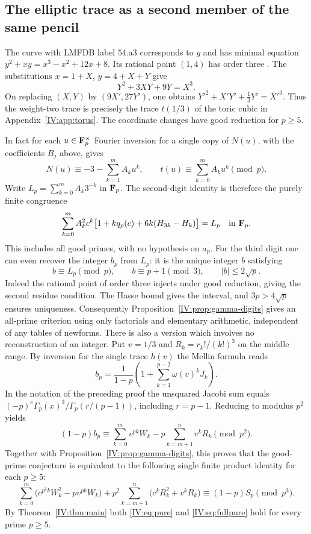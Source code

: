 \documentclass[11pt,letterpaper]{article}
\theoremstyle{definition}
\theoremstyle{remark}
\begin{document}
\subsection{The elliptic trace as a second member of the same pencil}
The curve with LMFDB label $54.\mathrm{a}3$ corresponds to $g$ and has
minimal equation $y^2+xy=x^3-x^2+12x+8$. Its rational point $(1,4)$
has order three \cite{IV:curve}. The substitutions $x=1+X$,
$y=4+X+Y$ give
\[
 Y^2+3XY+9Y=X^3 .
\]
On replacing $(X,Y)$ by $(9X',27Y')$, one obtains
$Y'^2+X'Y'+\tfrac13Y'=X'^3$. Thus the weight-two trace is precisely
the trace $t(1/3)$ of the toric cubic in Appendix~\ref{IV:app:torus}. The
coordinate changes have good reduction for $p\geq5$.

In fact for each $u\in\mathbf F_p^\times$ Fourier inversion for a single
copy of $N(u)$, with the coefficients $B_j$ above, gives
\[
 N(u)\equiv -3-\sum_{k=1}^m A_k u^k,\qquad
 t(u)\equiv \sum_{k=0}^m A_k u^k\pmod p .
\]
Write $L_p=\sum_{k=0}^m A_k3^{-k}$ in $\mathbf F_p$.
The second-digit identity is therefore the purely finite congruence
\begin{equation}\label{IV:eq:pure}
 \sum_{k=0}^m A_k^2c^k\bigl[1+k q_p(c)+6k(H_{3k}-H_k)\bigr]
 = L_p\quad \text{in }\mathbf F_p .
\end{equation}
This includes all good primes, with no hypothesis on $a_p$.
For the third digit one can even recover the integer $b_p$ from $L_p$:
it is the unique integer $b$ satisfying
\[
 b\equiv L_p\pmod p,\qquad b\equiv p+1\pmod3,\qquad |b|\leq2\sqrt p .
\]
Indeed the rational point of order three injects under good
reduction, giving the second residue condition. The Hasse bound
gives the interval, and $3p>4\sqrt p$ ensures uniqueness.
Consequently Proposition~\ref{IV:prop:gamma-digits} gives an all-prime
criterion using only factorials and elementary arithmetic, independent
of any tables of newforms. There is also a version which involves no reconstruction of an integer.
Put $v=1/3$ and $R_k=r_k!/(k!)^3$ on the middle range.
By inversion for the single trace $h(v)$ the Mellin formula reads
\[
 b_p=\frac{1}{1-p}\left(1+\sum_{k=1}^{p-2}\omega(v)^k J_k\right).
\]
In the notation of the preceding proof the unsquared Jacobi sum
equals $(-p)^e\Gamma_p(x)^3/\Gamma_p(r/(p-1))$, including $r=p-1$.
Reducing to modulus $p^2$ yields
\[
 (1-p)b_p\equiv \sum_{k=0}^{m}v^{pk}W_k
                     -p\sum_{k=m+1}^{n}v^kR_k\pmod{p^2}.
\]
Together with Proposition~\ref{IV:prop:gamma-digits}, this proves
that the good-prime conjecture is equivalent to the following single
finite product identity for each $p\geq5$:
\begin{equation}\label{IV:eq:fullpure}
 \sum_{k=0}^{m}\big(c^{p^2k}W_k^2-pv^{pk}W_k\big)
 +p^2\sum_{k=m+1}^{n}\big(c^kR_k^2+v^kR_k\big)
 \equiv(1-p)S_p\pmod{p^3}.
\end{equation}
By Theorem~\ref{IV:thm:main} both \eqref{IV:eq:pure} and \eqref{IV:eq:fullpure} hold for every prime $p\ge5$.
\end{document}
